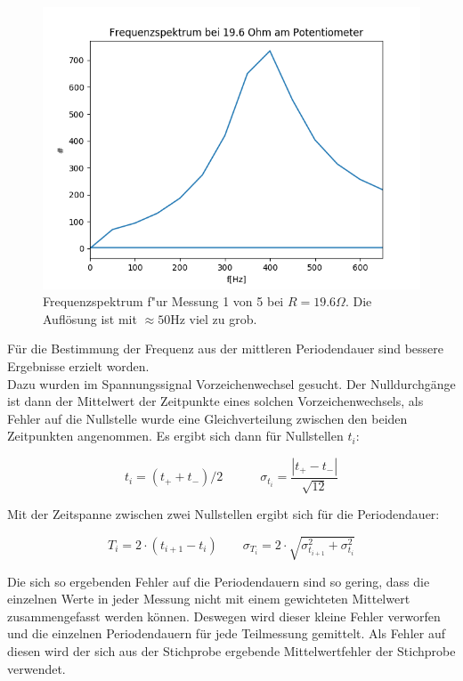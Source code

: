\documentclass[12pt,a4paper]{article}
\begin{document}
\begin{figure}
\begin{center}
\includegraphics[scale=0.75]{Bilder/fft_19,6Ohm}
\end{center}
\caption{Frequenzspektrum f"ur Messung 1 von 5 bei $R=19.6 \Omega$. Die Auflösung ist mit $\approx 50$Hz viel zu grob.}
\label{fig:Fourier19,6}
\end{figure}

Für die Bestimmung der Frequenz aus der mittleren Periodendauer sind bessere Ergebnisse erzielt worden.\\
Dazu wurden im Spannungssignal Vorzeichenwechsel gesucht. Der Nulldurchgänge ist dann der Mittelwert der Zeitpunkte eines solchen Vorzeichenwechsels, als Fehler auf die Nullstelle wurde eine Gleichverteilung zwischen den beiden Zeitpunkten angenommen. Es ergibt sich dann für Nullstellen $t_i$:

\begin{equation}
t_i=(t_++t_-)/2 \quad \quad \quad
\sigma_{t_i}=\frac{|t_+-t_-|}{\sqrt{12}}
\end{equation}

Mit der Zeitspanne zwischen zwei Nullstellen ergibt sich für die Periodendauer:

\begin{equation}
T_i=2\cdot (t_{i+1}-t_i) \quad \quad
\sigma_{T_i}=2\cdot \sqrt{\sigma_{t_{i+1}}^2+\sigma_{t_i}^2}
\end{equation}

Die sich so ergebenden Fehler auf die Periodendauern sind so gering, dass die einzelnen Werte in jeder Messung nicht mit einem gewichteten Mittelwert zusammengefasst werden können. Deswegen wird dieser kleine Fehler verworfen und die einzelnen Periodendauern für jede Teilmessung gemittelt. Als Fehler auf diesen wird der sich aus der Stichprobe ergebende Mittelwertfehler der Stichprobe verwendet.\\
\end{document}
